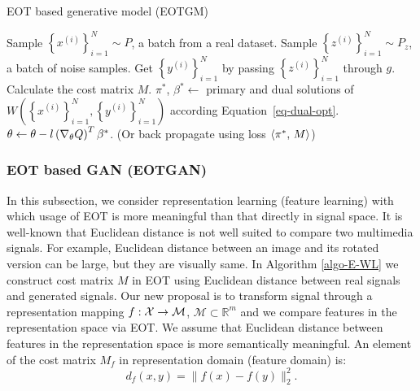 \begin{algorithm}
  \caption{EOT based generative model (EOTGM)}\label{algo-E-WL}
  \begin{algorithmic}[1]
    \STATE Sample $\left\{ x^{(i)} \right\}_{i=1}^{N} \sim P$, a batch
    from a real dataset. 
    \STATE Sample $\left\{ z^{(i)} \right\}_{i=1}^{N} \sim P_{z}$, a batch of noise samples.
    \STATE Get $\left\{ y^{(i)} \right\}_{i=1}^{N}$ by passing
    $\left\{ z^{(i)} \right\}_{i=1}^{N}$ through $g$.
    \STATE Calculate the cost matrix $M$.
    \STATE $\pi^{\ast}$, $\beta^{\ast} \gets$ primary and dual
    solutions of $W(\left\{ x^{(i)} \right\}_{i=1}^{N}, \left\{
      {y}^{(i)}\right\}_{i=1}^{N})$ according Equation~\eqref{eq-dual-opt}.
    \STATE $\theta \gets \theta - l \left(\nabla_{\theta}{Q}\right)^T
    \beta^{\ast}$. (Or back propagate using loss $\langle \pi^{\ast},\,M\rangle$)
    \ENDWHILE
  \end{algorithmic}
\end{algorithm}

\subsubsection{EOT based GAN (EOTGAN)}

In this subsection, we consider representation learning (feature
learning) with which usage of EOT is more meaningful than that
directly in signal space.
It is well-known that Euclidean distance is not well suited to compare
two multimedia signals. For example, Euclidean distance between an
image and its rotated version can be large, but they are visually same. In Algorithm \ref{algo-E-WL} we construct cost matrix $M$ in EOT using 
Euclidean distance between real signals and generated signals. Our new proposal is to transform signal through a representation mapping 
$f: \mathcal{X} \rightarrow \mathcal{M}$, $\mathcal{M}\subset\mathbb{R}^{m}$ and we compare features in the representation space via EOT. We assume that Euclidean distance
between features in the representation space is more semantically
meaningful. An element of the cost matrix $M_f$ in representation domain (feature domain) is:\vspace{-4pt}
\begin{equation}\label{def-similarity}
  d_f(x, y) = \|f(x)-f(y)\|_{2}^{2}.
\end{equation}

